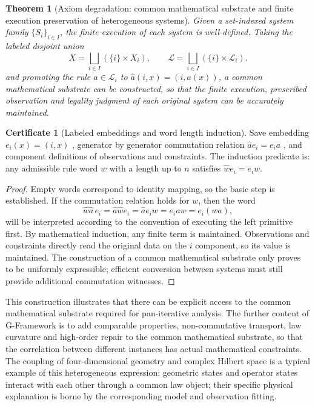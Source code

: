 \documentclass[11pt,a4paper]{article}
\theoremstyle{plain}
\newtheorem{theorem}{Theorem}[section]
\theoremstyle{definition}
\newtheorem*{certificate}{Certificate}
\theoremstyle{remark}
\begin{document}
\begin{CJK*}
\begin{theorem}
[Axiom degradation: common mathematical substrate and finite execution preservation of heterogeneous systems]\label{fa:thm-carrier}
Given a set-indexed system family $\{S_i\}_{i\in I}$, the finite execution of each system is well-defined. Taking the labeled disjoint union \[
 X=\bigsqcup_{i\in I}(\{i\}\times X_i),\qquad
 \mathcal L=\bigsqcup_{i\in I}(\{i\}\times\mathcal L_i).
\] and promoting the rule $a\in\mathcal L_i$ to $\widehat a(i,x)=(i,a(x))$, a common mathematical substrate can be constructed, so that the finite execution, prescribed observation and legality judgment of each original system can be accurately maintained.\end{theorem}
\begin{certificate}
[Labeled embeddings and word length induction]Save embedding $e_i(x)=(i,x)$ , generator by generator commutation relation $\widehat a e_i=e_i a$ , and component definitions of observations and constraints. The induction predicate is: any admissible rule word $w$ with a length up to $n$ satisfies $\widehat w e_i=e_i w$.\end{certificate}
\begin{proof}
Empty words correspond to identity mapping, so the basic step is established. If the commutation relation holds for $w$, then the word \[
 \widehat{wa}\,e_i=\widehat a\widehat w e_i
 =\widehat a e_iw=e_i a w=e_i(wa),
\] will be interpreted according to the convention of executing the left primitive first. By mathematical induction, any finite term is maintained. Observations and constraints directly read the original data on the $i$ component, so its value is maintained. The construction of a common mathematical substrate only proves to be uniformly expressible; efficient conversion between systems must still provide additional commutation witnesses.\end{proof}


This construction illustrates that there can be explicit access to the common mathematical substrate required for pan-iterative analysis. The further content of G-Framework is to add comparable properties, non-commutative transport, law curvature and high-order repair to the common mathematical substrate, so that the correlation between different instances has actual mathematical constraints. The coupling of four-dimensional geometry and complex Hilbert space is a typical example of this heterogeneous expression: geometric states and operator states interact with each other through a common law object; their specific physical explanation is borne by the corresponding model and observation fitting. \cite{S01,S02}


\end{CJK*}
\end{document}
